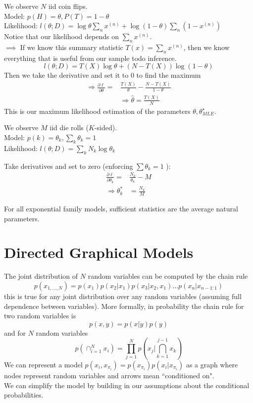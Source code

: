 \documentclass[11pt]{article}
\begin{document}
We observe $N$ iid coin flips. \\
Model: $p(H) = \theta, P(T) = 1 - \theta$\\
Likelihood: $l(\theta; D) = \log \theta \sum_n x^{(n)} + \log (1-\theta) \sum_n (1 - x^{(n)})$\\
Notice that our likelihood depends on $\sum_n x^{(n)}$. \\
$\implies$ If we know this summary statistic $T(x) = \sum_n x^{(n)}$, then we know everything that is useful from our sample todo inference.\\
$$l(\theta; D) = T(X)\log \theta + (N - T(X)) \log (1 - \theta)$$
Then we take the derivative and set it to 0 to find the maximum
\[
\begin{aligned}
\Rightarrow \frac{\partial \ell}{\partial \theta}=& \frac{T(X)}{\theta}-\frac{N-T(X)}{1-\theta} \\
& \Rightarrow \hat{\theta}=\frac{T(X)}{N}
\end{aligned}
\]
This is our maximum likelihood estimation of the parameters \(\theta, \theta_{M L E}^{\star}\).

\example[Multinomial]
We observe $M$ iid die rolls ($K$-sided). \\
Model: $p(k) = \theta_k, \sum_k \theta_k = 1$ \\
Likelihood: $l(\theta; D) = \sum_k N_k \log \theta_k$ 

Take derivatives and set to zero (enforcing \(\sum \theta_{k}=1\) ):
\[
\begin{aligned}
\frac{\partial \ell}{\partial \theta_{k}}=& \frac{N_{k}}{\theta_{k}}-M \\
 \Rightarrow \theta_{k}^{*}&=\frac{N_{k}}{M}
\end{aligned}
\]

For all exponential family models, sufficient statistics are the average natural parameters.

\section{Directed Graphical Models}
\notation
The joint distribution of \(N\) random variables can be computed by the chain rule
\[
p\left(x_{1, \ldots, N}\right)=p\left(x_{1}\right) p\left(x_{2} | x_{1}\right) p\left(x_{3} | x_{2}, x_{1}\right) \ldots p\left(x_{n} | x_{n-1: 1}\right)
\]
this is true for any joint distribution over any random variables (assuming full dependence between variables).
More formally, in probability the chain rule for two random variables is
\[
p(x, y)=p(x | y) p(y)
\]
and for \(N\) random variables
\[
p\left(\cap_{i=1}^{N} x_{i}\right)=\prod_{j=1}^{N} p\left(x_{j} | \bigcap_{k=1}^{j-1} x_{k}\right)
\]
We can represent a model $p(x_i, x_{\pi_i}) = p(x_{\pi_i})p(x_i|x_{\pi_i})$ as a graph where nodes represent random variables and arrows mean ``conditioned on".\\
We can simplify the model by building in our assumptions about the conditional probabilities.
\end{document}
